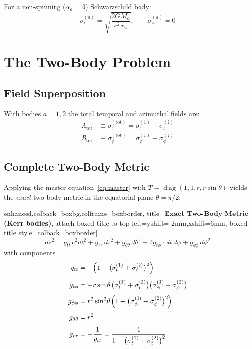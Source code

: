 \documentclass[11pt,a4paper]{article}
\theoremstyle{definition}
\theoremstyle{remark}
\newcommand{\sig}[2]{\sigma_{#1}^{(#2)}}
\begin{document}
	For a non-spinning ($\alpha_a=0$) Schwarzschild body:
	\begin{equation}\label{eq:sigma_schw}
		\sig{t}{a} = \sqrt{\frac{2GM_a}{c^2\,r_a}},\qquad
		\sig{\phi}{a} = 0
	\end{equation}
	
	\section{The Two-Body Problem}
	\label{sec:two_body}
	
	\subsection{Field Superposition}
	
	With bodies $a=1,2$ the total temporal and azimuthal fields are:
	\begin{align}
		A_{\mathrm{tot}} &\equiv \sig{t}{\mathrm{tot}}
		= \sig{t}{1} + \sig{t}{2}
		\label{eq:A_tot_2}\\
		B_{\mathrm{tot}} &\equiv \sig{\phi}{\mathrm{tot}}
		= \sig{\phi}{1} + \sig{\phi}{2}
		\label{eq:B_tot_2}
	\end{align}
	
	\subsection{Complete Two-Body Metric}
	
	Applying the master equation~\eqref{eq:master} with
	$T=\operatorname{diag}(1,1,r,r\sin\theta)$ yields the \emph{exact}
	two-body metric in the equatorial plane $\theta=\pi/2$:
	
	enhanced,colback=boxbg,colframe=boxborder,
		title={\color{white}\bfseries Exact Two-Body Metric (Kerr bodies)},
		attach boxed title to top left={yshift=-2mm,xshift=6mm},
		boxed title style={colback=boxborder}]
		\begin{equation}\label{eq:metric_2body}
			ds^2 = g_{tt}\,c^2dt^2
			+ g_{rr}\,dr^2
			+ g_{\theta\theta}\,d\theta^2
			+ 2g_{t\phi}\,c\,dt\,d\phi
			+ g_{\phi\phi}\,d\phi^2
		\end{equation}
		with components:
		\begin{align}
			g_{tt} &= -\Bigl(1 - \bigl(\sig{t}{1}+\sig{t}{2}\bigr)^2\Bigr)
			\label{eq:gtt_2}\\[4pt]
			g_{t\phi} &= -r\sin\theta\,
			\bigl(\sig{t}{1}+\sig{t}{2}\bigr)
			\bigl(\sig{\phi}{1}+\sig{\phi}{2}\bigr)
			\label{eq:gtphi_2}\\[4pt]
			g_{\phi\phi} &= r^2\sin^2\!\theta\,
			\Bigl(1+\bigl(\sig{\phi}{1}+\sig{\phi}{2}\bigr)^2\Bigr)
			\label{eq:gphiphi_2}\\[4pt]
			g_{\theta\theta} &= r^2\\[4pt]
			g_{rr} &= -\dfrac{1}{g_{tt}}
			= \dfrac{1}{1-\bigl(\sig{t}{1}+\sig{t}{2}\bigr)^2}
			\label{eq:grr_2}
		\end{align}
	
\end{document}
